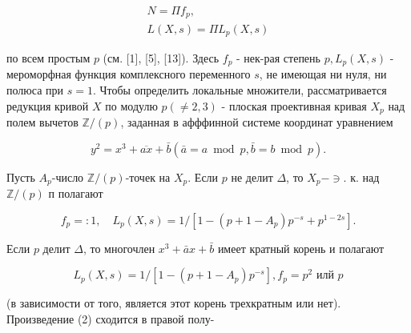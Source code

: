\documentclass[10pt]{article}
\begin{document}
\[

\begin{gathered}

N=\Pi f_{p}, \\

L(X, s)=\Pi L_{p}(X, s)

\end{gathered}

\]



по всем простым $p$ (см. [1], [5], [13]). Здесь $f_{p}$ - нек-рая степень $p, L_{p}(X, s)$ - мероморфная функция комплексного переменного $s$, не имеющая ни нуля, ни полюса при $s=1$. Чтобы определить локальные множители, рассматривается редукция кривой $X$ по модулю $p(\neq 2,3)$ - плоская проективная кривая $X_{p}$ над полем вычетов $\mathbb{Z} /(p)$, заданная в афффинной системе координат уравнением



\[

y^{2}=x^{3}+\overline{a x}+\bar{b}(\bar{a}=a \bmod p, \bar{b}=b \bmod p) .

\]



Пусть $A_{p}$-число $\mathbb{Z} /(p)$-точек на $X_{p}$. Если $p$ не делит $\Delta$, то $X_{p}-\ni$. к. над $\mathbb{Z} /(p)$ п полагают



\[

f_{p}=: 1, \quad L_{p}(X, s)=1 /\left[1-\left(p+1-A_{p}\right) p^{-s}+p^{1-2 s}\right] .

\]



Если $p$ делит $\Delta$, то многочлен $x^{3}+\bar{a} x+\bar{b}$ имеет кратный корень и полагают



\[

L_{p}(X, s)=1 /\left[1-\left(p+1-A_{p}\right) p^{-s}\right], f_{p}=p^{2} \text { илй } p

\]



(в зависимости от того, является этот корень трехкратным или нет). Произведение (2) сходится в правой полу-
\end{document}
